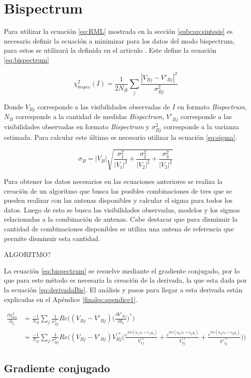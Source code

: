 \chapter{Bispectrum}
\label{cap:bispectrum}

Para utilizar la ecuación \ref{eq:RML} mostrada en la sección \ref{subcap:sintesis} es necesario definir la ecuación a minimizar para los datos del modo bispectrum, para estos se utilizará la definida en el articulo \cite{Chael_2018}. Este define la ecuación \ref{eq:bispectrum}

\begin{equation}
    \chi^{2}_{bispec}(I) = \frac{1}{2N_{B}} \sum_{j} \frac{| V_{Bj}  - V'_{Bj}|^2}{\sigma^{2}_{Bj}}
    \label{eq:bispectrum}
\end{equation}

Donde $V_{Bj}$ corresponde a las visibilidades observadas de $I$ en formato \textit{Bispectrum}, $N_{B}$ corresponde a la cantidad de medidas \textit{Bispectrum}, $V'_{Bj}$ corresponde a las visibilidades observadas en formato \textit{Bispectrum} y $\sigma^{2}_{Bj}$ corresponde a la varianza estimada. Para calcular este último es necesario utilizar la ecuación \ref{eq:sigma}.

\begin{equation}
    \sigma_{B} = |V_{B}| \sqrt{\frac{\sigma^{2}_{1}}{|V_{1}|^{2}} + \frac{\sigma^{2}_{2}}{|V_{2}|^{2}} + \frac{\sigma^{2}_{3}}{|V_{3}|^{2}}}
    \label{eq:sigma}
\end{equation}

Para obtener los datos necesarios en las ecuaciones anteriores se realiza la creación de un algoritmo que busca las posibles combinaciones de tres que se pueden realizar con las antenas disponibles y calcular el sigma para todos los datos. Luego de esto se busca las visibilidades observadas, modelos y los sigmas relacionadas a la combinación de antenas. Cabe destacar que para disminuir la cantidad de combinaciones disponibles se utiliza una antena de referencia que permite disminuir esta cantidad. 

ALGORITMO?

La ecuación \ref{eq:bispectrum} se resuelve mediante el gradiente conjugado, por lo que para este método es necesaria la creación de la derivada, la que esta dada por la ecuación \ref{eq:derivadaBis}. El análisis y pasos para llegar a esta derivada están explicadas en el Apéndice \ref{finales:apendice1}.

\begin{equation}
    \begin{split}
        \frac{\partial{\chi^{2}_{bis}}}{\partial_{I_{k}}} &= \frac{-1}{N_{B}} \sum_{j} \frac{1}{\sigma^{2}_{Bj}} Re\bigg((V_{Bj} - V'_{Bj}) \bigg( \frac{\partial{V'_{Bj}}}{\partial{I_{k}}} \bigg)^{*} \bigg) \\
        &= \frac{-1}{N_{B}} \sum_{j} \frac{1}{\sigma^{2}_{Bj}} Re\bigg((V_{Bj} - V'_{Bj}) V^{'*}_{Bj} \bigg( \frac{e^{2\pi i (u_{1j}x_{k} + v_{1j}y_{k})}}{V^{'*}_{1j}} + \frac{e^{2\pi i (u_{2j}x_{k} + v_{2j}y_{k})}}{V^{'*}_{2j}} + \frac{e^{2\pi i (u_{3j}x_{k} + v_{3j}y_{k})}}{V'^{'*}_{3j}}\bigg) \bigg) 
    \end{split}
    \label{eq:derivadaBis}
\end{equation}

\section{Gradiente conjugado}
